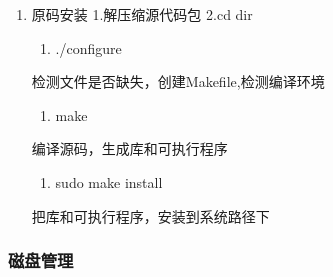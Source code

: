 \documentclass[11pt]{article}
\begin{document}
\begin{enumerate}
\item 原码安装
\label{sec-1-1-5-4}
1.解压缩源代码包
2.cd dir
\begin{enumerate}
\item ./configure
\end{enumerate}
检测文件是否缺失，创建Makefile,检测编译环境
\begin{enumerate}
\item make
\end{enumerate}
编译源码，生成库和可执行程序
\begin{enumerate}
\item sudo make install
\end{enumerate}
把库和可执行程序，安装到系统路径下
\end{enumerate}
\subsubsection{磁盘管理}
\label{sec-1-1-6}
\end{document}
